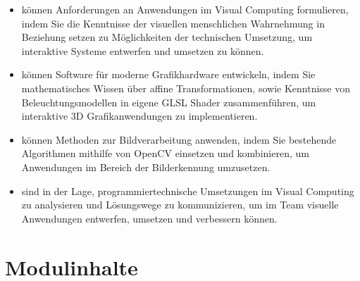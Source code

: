 \begin{itemize}
\tightlist
\item
  können Anforderungen an Anwendungen im Visual Computing formulieren,
  indem Sie die Kenntnisse der visuellen menschlichen Wahrnehmung in
  Beziehung setzen zu Möglichkeiten der technischen Umsetzung, um
  interaktive Systeme entwerfen und umsetzen zu können.
\item
  können Software für moderne Grafikhardware entwickeln, indem Sie
  mathematisches Wissen über affine Transformationen, sowie Kenntnisse
  von Beleuchtungsmodellen in eigene GLSL Shader zusammenführen, um
  interaktive 3D Grafikanwendungen zu implementieren.
\item
  können Methoden zur Bildverarbeitung anwenden, indem Sie bestehende
  Algorithmen mithilfe von OpenCV einsetzen und kombinieren, um
  Anwendungen im Bereich der Bilderkennung umzusetzen.
\item
  sind in der Lage, programmiertechnische Umsetzungen im Visual
  Computing zu analysieren und Lösungswege zu kommunizieren, um im Team
  visuelle Anwendungen entwerfen, umsetzen und verbessern können.
\end{itemize}

\hypertarget{modulinhaltepathlabel....srcmodulbeschreibungen-bachelor-bpo5ba_visual-computing}{%
\section*{Modulinhalte\label{../../src/modulbeschreibungen-bachelor-bpo5/BA_Visual-Computing}}\label{modulinhaltepathlabel....srcmodulbeschreibungen-bachelor-bpo5ba_visual-computing}}

